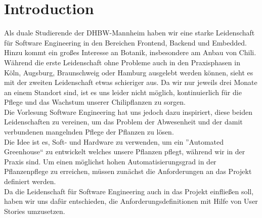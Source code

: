 \section{Introduction}
Als duale Studierende der DHBW-Mannheim haben wir eine starke Leidenschaft für Software Engineering in den Bereichen Frontend, Backend und Embedded.
Hinzu kommt ein großes Interesse an Botanik, insbesondere am Anbau von Chili. 
Während die erste Leidenschaft ohne Probleme auch in den Praxisphasen in Köln, Augsburg, Braunschweig oder Hamburg ausgelebt werden können, 
sieht es mit der zweiten Leidenschaft etwas schieriger aus. 
Da wir nur jeweils drei Monate an einem Standort sind, ist es uns leider nicht möglich, kontinuierlich für die Pflege und das Wachstum unserer Chilipflanzen zu sorgen. 
\\
Die Vorlesung Software Engineering hat uns jedoch dazu inspiriert, diese beiden Leidenschaften zu vereinen, um das Problem der Abwesenheit und der damit verbundenen mangelnden Pflege der Pflanzen zu lösen. 
\\
Die Idee ist es, Soft- und Hardware zu verwenden, um ein ''Automated Greenhouse`` zu entwickelt welches unsere Pflanzen pflegt, während wir in der Praxis sind. Um einen möglichst hohen Automatisierungsgrad in der Pflanzenpflege zu erreichen, müssen zunächst die Anforderungen an das Projekt definiert werden.
\\
Da die Leidenschaft für Software Engineering auch in das Projekt einfließen soll, haben wir uns dafür entschieden, die Anforderungsdefinitionen mit Hilfe von User Stories umzusetzen.
\\
